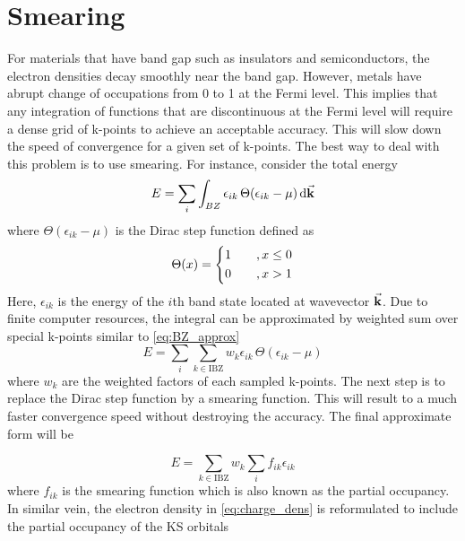 \section{Smearing}
For materials that have band gap such as insulators and semiconductors, the electron densities decay smoothly near the band gap. However, metals have abrupt change of occupations from 0 to 1 at the Fermi level. This implies that any integration of functions that are discontinuous at the Fermi level will require a dense grid of k-points to achieve an acceptable accuracy. This will slow down the speed of convergence for a given set of k-points. The best way to deal with this problem is to use smearing. For instance, consider the total energy
\begin{equation}
	E = \sum_{i} \int_{BZ} \epsilon_{ik}\, \Theta(\epsilon_{ik} - \mu) \dd{\va{k}}
\end{equation}
where $\Theta(\epsilon_{ik} - \mu)$ is the Dirac step function defined as
\begin{equation}
	\Theta(x)=
	\begin{dcases}
		1   \quad & , x \leq 0 \\
		0         & , x > 1    \\
	\end{dcases}
\end{equation}
Here, $\epsilon_{ik}$ is the energy of the $i$th band state located at wavevector $\va{k}$. Due to finite computer resources, the integral can be approximated by weighted sum over special k-points similar to \eqref{eq:BZ_approx}
\begin{equation}
	E = \sum_{i} \sum_{k \in \text{IBZ}} w_k \epsilon_{ik} \, \Theta(\epsilon_{ik} - \mu)
\end{equation}
where $w_k$ are the weighted factors of each sampled k-points. The next step is to replace the Dirac step function by a smearing  function. This will result to a much faster convergence speed without destroying the accuracy. The final approximate form will be

\begin{equation}
	E =  \sum_{k \in \text{IBZ}} w_k \sum_{i} f_{ik} \epsilon_{ik}
\end{equation}
where $f_{ik}$ is the smearing function which is also known as the partial occupancy. In similar vein, the electron density in
\eqref{eq:charge_dens} is reformulated to include the partial occupancy of the KS orbitals

